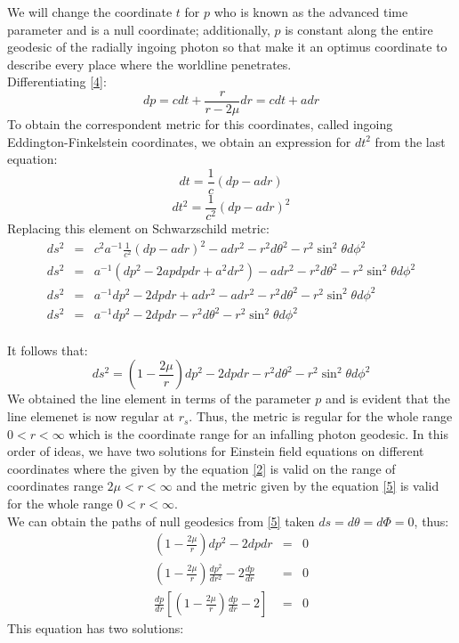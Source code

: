 \documentclass[letterpaper,11pt,onecolumn]{article}
\begin{document}
We will change the coordinate $t$ for $p$ who is known as the advanced time parameter and is a null coordinate; additionally, $p$ is constant along the entire geodesic of the radially ingoing photon so that make it an optimus coordinate to describe every place where the worldline penetrates.\\
Differentiating \ref{4}: 
\begin{equation*}
    dp= cdt +\frac{r}{r-2\mu}dr=cdt+adr 
\end{equation*}
To obtain the correspondent metric for this coordinates, called ingoing Eddington-Finkelstein coordinates, we obtain an expression for $dt^2$ from the last equation:
\begin{equation*}
    dt= \frac{1}{c} (dp-adr)
\end{equation*}
\begin{equation*}
    dt^2= \frac{1}{c^2} (dp-adr)^2
\end{equation*}
Replacing this element on Schwarzschild metric:
\\
\begin{eqnarray*}
    	ds^2 &=&c^2a^{-1}\frac{1}{c^2} (dp-adr)^2 - a dr^2 - r^2 d\theta^2 - r^2 \sin^2 \theta d\phi^2\\
    	ds^2 &=& a^{-1}(dp^2-2apdpdr+a^2dr^2) - a dr^2 - r^2 d\theta^2 - r^2 \sin^2 \theta d\phi^2\\
    	ds^2 &=& a^{-1}dp^2-2dpdr+adr^2- a dr^2 - r^2 d\theta^2 - r^2 \sin^2 \theta d\phi^2\\ 
    	ds^2 &=& a^{-1}dp^2-2dpdr-  r^2 d\theta^2 - r^2 \sin^2 \theta d\phi^2
\end{eqnarray*}
\\
It follows that:
\begin{equation}
ds^2 =\left( 1 - \frac{2\mu}{r}\right)dp^2-2dpdr- r^2 d\theta^2 - r^2 \sin^2 \theta d\phi^2 \label{5}
\end{equation}
We obtained the line element in terms of the parameter $p$ and is evident that the line elemenet is now regular at $r_s$. Thus, the metric is regular for the whole range $0<r<\infty$ which is the coordinate range for an infalling photon geodesic. In this order of ideas, we have two solutions for Einstein field equations on different coordinates where the given by the equation \ref{2}  is valid on the range of coordinates range $2\mu<r<\infty$ and the metric given by the equation \ref{5} is valid for the whole range $0<r<\infty$.
\\We can obtain the paths of null geodesics from \ref{5} taken $ds=d\theta=d\Phi=0$, thus:
\begin{eqnarray*}
\left( 1 - \frac{2\mu}{r}\right)dp^2-2dpdr&=&0\\
\left( 1 - \frac{2\mu}{r}\right)\frac{dp^2}{dr^2}-2\frac{dp}{dr}&=&0\\
\frac{dp}{dr}\left[\left( 1 - \frac{2\mu}{r}\right)\frac{dp}{dr}-2\right]&=&0
\end{eqnarray*}
This equation has two solutions:
\end{document}
